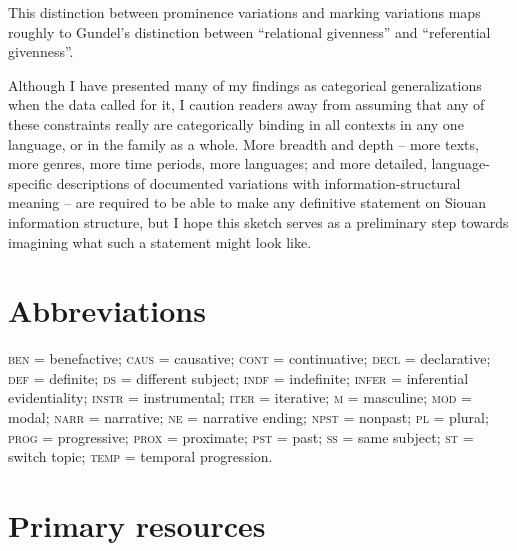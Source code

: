 \documentclass[output=paper]{LSP/langsci}
\begin{document}
This distinction between prominence variations and marking variations maps roughly to Gundel’s \citeyearpar{Gundel2003, Gundel1988} distinction between “relational givenness” and  “referential givenness”.

Although I have presented many of my findings as categorical generalizations when the data called for it, I caution readers away from assuming that any of these constraints really are categorically binding in all contexts in any one language, or in the family as a whole. More breadth and depth -- more texts, more genres, more time periods, more languages; and more detailed, language-specific descriptions of documented variations with information-structural meaning -- are required to be able to make any definitive statement on Siouan information structure, but I hope this sketch serves as a preliminary step towards imagining what such a statement might look like.

\section* {Abbreviations}

\textsc{ben} = benefactive; \textsc{caus} = causative; \textsc{cont} = continuative; \textsc{decl} = declarative; \textsc{def} = definite; \textsc{ds} =  different subject; \textsc{indf} = indefinite; \textsc{infer} = inferential evidentiality; \textsc{instr} = instrumental; \textsc{iter} = iterative; \textsc{m} =  masculine; \textsc{mod} = modal; \textsc{narr} = narrative; \textsc{ne} = narrative ending; \textsc{npst} = nonpast; \textsc{pl} = plural; \textsc{prog} =  progressive; \textsc{prox} = proximate; \textsc{pst} = past; \textsc{ss} = same subject; \textsc{st} = switch topic; \textsc{temp} = temporal progression.

\section*{Primary resources}
\end{document}
